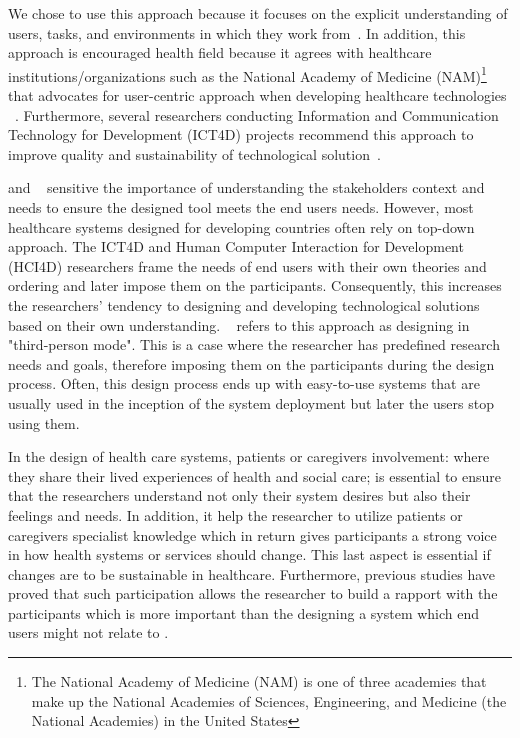 We chose to use this approach because it focuses on the explicit understanding of users, tasks, and environments in which they work from~\citep{Abras2004}. In addition, this approach is encouraged health field because it agrees with healthcare institutions/organizations such as the National Academy of Medicine (NAM)\footnote{The National Academy of Medicine (NAM) is one of three academies that make up the National Academies of Sciences, Engineering, and Medicine (the National Academies) in the United States} that advocates for user-centric approach when developing healthcare technologies ~\citep{DeVitoDabbs2009}.  Furthermore, several researchers conducting Information and Communication Technology for Development (ICT4D) projects recommend this approach to improve quality and sustainability of technological solution~\citep{Heeks2008,Pankomera2018, Mukisa2017}.

\textcite{Piper2018} and ~\textcite{Rogers2013} sensitive the importance of understanding the stakeholders context and needs to ensure the designed tool meets the end users needs. However, most healthcare systems designed for developing countries often rely on top-down approach. The ICT4D and Human Computer Interaction for Development (HCI4D) researchers frame the needs of end users with their own theories and ordering and later impose them on the participants. Consequently, this increases the researchers' tendency to designing and developing technological solutions based on their own understanding. ~\textcite{Rogers2013} refers to this approach as designing in "third-person mode". This is a case where the researcher has predefined research needs and goals, therefore imposing them on the participants during the design process. Often, this design process ends up with easy-to-use systems that are usually used in the inception of the system deployment but later the users stop using them.

In the design of health care systems, patients or caregivers involvement: where they share their lived experiences of health and social care; is essential to ensure that the researchers understand not only their system desires but also their feelings and needs. In addition, it help the researcher to utilize patients or caregivers specialist knowledge which in return gives participants a strong voice in how health systems or services should change. This last aspect is essential if changes are to be sustainable in healthcare. Furthermore, previous studies have proved that such participation allows the researcher to build a rapport with the participants which is more important than the designing a system which end users might not relate to \citep{Wolstenholme2017,Nilsson2016,Ward2018}. 

